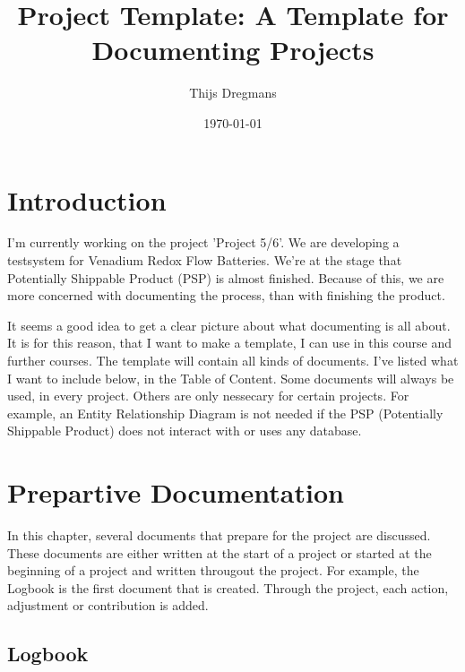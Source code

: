\documentclass[10pt]{report}
\title{Project Template: A Template for Documenting Projects}
\date{\today}
\author{Thijs Dregmans}
\begin{document}
\maketitle

\chapter{Introduction}
\thispagestyle{fancy}

I'm currently working on the project 'Project 5/6'. We are developing a testsystem for Venadium Redox Flow Batteries. We're at the stage that Potentially Shippable Product (PSP) is almost finished. Because of this, we are more concerned with documenting the process, than with finishing the product.

It seems a good idea to get a clear picture about what documenting is all about. It is for this reason, that I want to make a template, I can use in this course and further courses. The template will contain all kinds of documents. I've listed what I want to include below, in the Table of Content. Some documents will always be used, in every project. Others are only nessecary for certain projects. For example, an Entity Relationship Diagram is not needed if the PSP (Potentially Shippable Product) does not interact with or uses any database.

\newpage

\tableofcontents

\newpage

\chapter{Prepartive Documentation}
\thispagestyle{fancy}

In this chapter, several documents that prepare for the project are discussed. These documents are either written at the start of a project or started at the beginning of a project and written througout the project. For example, the Logbook is the first document that is created. Through the project, each action, adjustment or contribution is added.

\medskip
\minitoc

\newpage

\section{Logbook}
\end{document}
